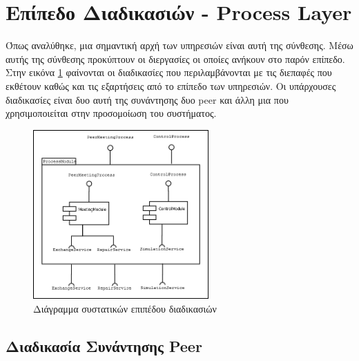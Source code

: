 \section{Επίπεδο Διαδικασιών - Process Layer}

Όπως αναλύθηκε, μια σημαντική αρχή των υπηρεσιών είναι αυτή της 
σύνθεσης. Μέσω αυτής της σύνθεσης προκύπτουν οι διεργασίες οι οποίες 
ανήκουν στο παρόν επίπεδο. Στην εικόνα \ref{fig:ProcessComponent} φαίνονται 
οι διαδικασίες που περιλαμβάνονται με τις διεπαφές που εκθέτουν καθώς και τις 
εξαρτήσεις από το επίπεδο των υπηρεσιών. Οι υπάρχουσες διαδικασίες είναι 
δυο αυτή της συνάντησης δυο peer και άλλη μια που χρησιμοποιείται στην 
προσομοίωση του συστήματος.

\begin{figure}[htbp]
  \begin{center}
    \includegraphics[width=0.6\textwidth]{Figures/Architecture/Process_Layer/Process_ComponentDiagram.png}
  \end{center}
  \caption{Διάγραμμα συστατικών επιπέδου διαδικασιών}
  \label{fig:ProcessComponent}
\end{figure}

\subsection{Διαδικασία Συνάντησης Peer}

